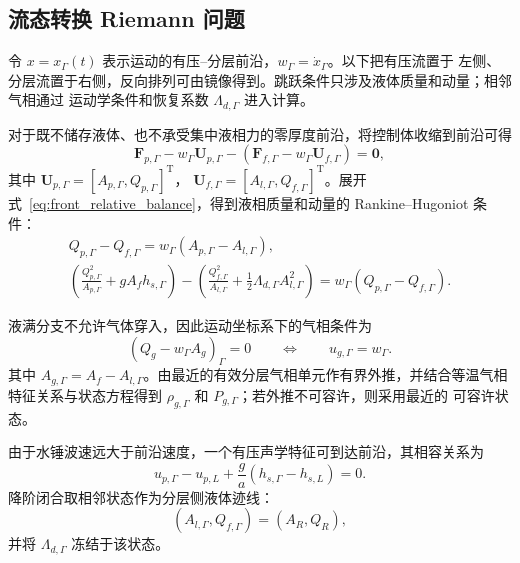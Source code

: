 \subsection{流态转换 Riemann 问题}
\label{sec:model:front}

令 $x=x_\Gamma(t)$ 表示运动的有压--分层前沿，$w_\Gamma=\dot x_\Gamma$。以下把有压流置于
左侧、分层流置于右侧，反向排列可由镜像得到。跳跃条件只涉及液体质量和动量；相邻气相通过
运动学条件和恢复系数 $\Lambda_{d,\Gamma}$ 进入计算。

对于既不储存液体、也不承受集中液相力的零厚度前沿，将控制体收缩到前沿可得
\begin{equation}
\mathbf F_{p,\Gamma}-w_\Gamma\mathbf U_{p,\Gamma}
-\left(\mathbf F_{f,\Gamma}-w_\Gamma\mathbf U_{f,\Gamma}\right)
=\mathbf 0,
\label{eq:front_relative_balance}
\end{equation}
其中 $\mathbf U_{p,\Gamma}=[A_{p,\Gamma},Q_{p,\Gamma}]^{\mathrm T}$，
$\mathbf U_{f,\Gamma}=[A_{l,\Gamma},Q_{f,\Gamma}]^{\mathrm T}$。展开
式~\eqref{eq:front_relative_balance}，得到液相质量和动量的 Rankine--Hugoniot 条件：
\begin{equation}
\begin{gathered}
Q_{p,\Gamma}-Q_{f,\Gamma}
=w_\Gamma\left(A_{p,\Gamma}-A_{l,\Gamma}\right),\\[4pt]
\left(\frac{Q_{p,\Gamma}^2}{A_{p,\Gamma}}+gA_fh_{s,\Gamma}\right)
-\left(\frac{Q_{f,\Gamma}^2}{A_{l,\Gamma}}
+\frac12\Lambda_{d,\Gamma}A_{l,\Gamma}^2\right)
=w_\Gamma\left(Q_{p,\Gamma}-Q_{f,\Gamma}\right).
\end{gathered}
\label{eq:front_jump}
\end{equation}

液满分支不允许气体穿入，因此运动坐标系下的气相条件为
\begin{equation}
\left(Q_g-w_\Gamma A_g\right)_\Gamma=0
\qquad\Longleftrightarrow\qquad
u_{g,\Gamma}=w_\Gamma.
\label{eq:front_gas_condition}
\end{equation}
其中 $A_{g,\Gamma}=A_f-A_{l,\Gamma}$。由最近的有效分层气相单元作有界外推，并结合等温气相
特征关系与状态方程得到 $\rho_{g,\Gamma}$ 和 $P_{g,\Gamma}$；若外推不可容许，则采用最近的
可容许状态。

由于水锤波速远大于前沿速度，一个有压声学特征可到达前沿，其相容关系为
\begin{equation}
u_{p,\Gamma}-u_{p,L}
+\frac{g}{a}\left(h_{s,\Gamma}-h_{s,L}\right)=0.
\label{eq:front_pressurized_compatibility}
\end{equation}
降阶闭合取相邻状态作为分层侧液体迹线：
\begin{equation}
\left(A_{l,\Gamma},Q_{f,\Gamma}\right)=\left(A_R,Q_R\right),
\label{eq:front_stratified_trace}
\end{equation}
并将 $\Lambda_{d,\Gamma}$ 冻结于该状态。

